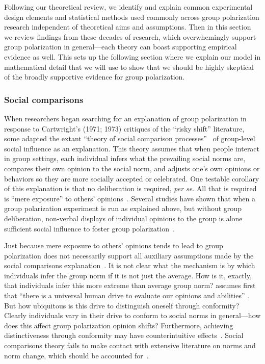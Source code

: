 Following our theoretical review, we identify and explain common experimental design
elements and statistical methods used commonly across group polarization research
independent of theoretical aims and assumptions. Then in this section
we review findings from these decades of research, which overwhemingly support 
group polarization in general---each theory can boast supporting empirical
evidence as well. This sets up the following section where
we explain our model in mathematical detail that we will use to
show that we should be highly skeptical of the broadly supportive evidence for group polarization. 

\subsubsection{Social comparisons}

When researchers began searching for an explanation of group polarization
in response to Cartwright's (1971; 1973) critiques of the ``risky shift'' literature, 
some adapted the extant ``theory of social comparison processes''~\cite{Festinger1954} of group-level
social influence as an explanation. This theory assumes that when people
interact in group settings, each individual infers what the prevailing
social norms are, compares their own opinion to the social norm, and adjusts 
one's own opinions or behaviors so they are more socially accepted or celebrated. 
One testable corollary of this explanation is that no deliberation is required, \emph{per se}.
All that is required is ``mere exposure'' to others' 
opinions~\cite{Zajonc1968,Burgess1971,Bornstein1990,Montoya2017}. Several studies
have shown that when a group polarization experiment is run as explained above,
but without group deliberation, non-verbal displays of individual opinions 
to the group is alone sufficient social influence to foster group 
polarization~\cite{Teger1967,Blascovich1973,Blascovich1975,Blascovich1976,Sanders1977,Myers1978,Myers1982}.

Just because mere exposure to others' opinions tends to lead to group polarization
does not necessarily support all auxiliary assumptions made by the
social comparisons explanation~\cite{Meehl1990}. It is not clear what the
mechanism is by which individuals infer the group norm if it is not just the
average. How is it, exactly, that individuals infer this more extreme than
average group norm?  assumes first that ``there is a 
universal human drive to evaluate our opinions and abilities'' \cite[p. 78]{Brown2000}.
But how ubiquitous is this drive to distinguish oneself through conformity?
Clearly individuals vary in their drive to conform to social norms in general---how
does this affect group polarization opinion shifts?
Furthermore, achieving distinctiveness through conformity may have counterintuitive
effects~\cite{Smaldino2015a}. Social comparisons theory fails to make contact
with extensive literature on norms and norm change, which should be accounted
for~\cite{Bicchieri2006,Bicchieri2014,Bicchieri2017}.

